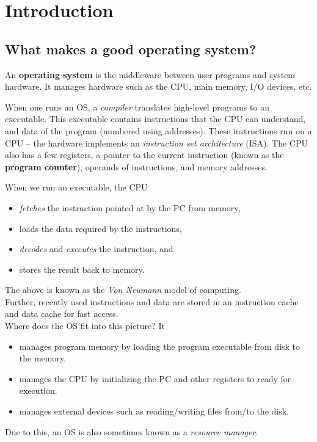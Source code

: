 \documentclass{article}
\begin{document}
\thispagestyle{empty}
\titleBC



\section{Introduction} %
\label{sec:introduction}

	\subsection{What makes a good operating system?}
	
		An \textbf{operating system} is the middleware between user programs and system hardware. It manages hardware such as the CPU, main memory, I/O devices, etc.

		When one runs an OS, a \emph{compiler} translates high-level programs to an executable. This executable contains instructions that the CPU can understand, and data of the program (numbered using addresses). These instructions run on a CPU -- the hardware implements an \emph{instruction set architecture} (ISA). The CPU also has a few registers, a pointer to the current instruction (known as the \textbf{program counter}), operands of instructions, and memory addresses.

		When we run an executable, the CPU
		\begin{itemize}
			\item \emph{fetches} the instruction pointed at by the PC from memory,
			\item loads the data required by the instructions,
			\item \emph{decodes} and \emph{executes} the instruction, and
			\item stores the result back to memory.
		\end{itemize}
		The above is known as the \emph{Von Neumann} model of computing.\\
		Further, recently used instructions and data are stored in an instruction cache and data cache for fast access.\\

		Where does the OS fit into this picture? It
		\begin{itemize}
			\item manages program memory by loading the program executable from disk to the memory.
			\item manages the CPU by initializing the PC and other registers to ready for execution.
			\item manages external devices such as reading/writing files from/to the disk.
		\end{itemize}
		Due to this, an OS is also sometimes known as a \emph{resource manager}.\\
\end{document}
